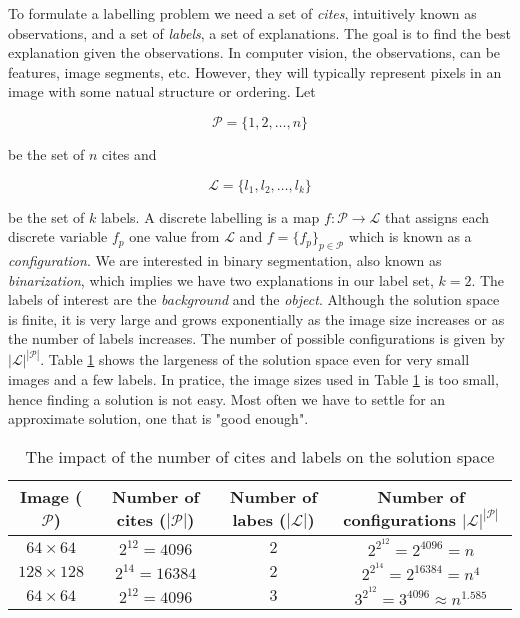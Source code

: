 To formulate a labelling problem we need a set of \textit{cites}, intuitively known as observations, and a set of \textit{labels}, a set of explanations.
The goal is to find the best explanation given the observations.
In computer vision, the observations, can be features, image segments, etc.
However, they will typically represent pixels in an image with some natual structure or ordering.
Let 

\begin{equation*}
	\mathcal{P} = \{1, 2, \ldots, n\}
\end{equation*}

be the set of $n$ cites and 

\begin{equation*}
\mathcal{L} = \{l_1, l_2, \ldots, l_k\}
\end{equation*}

be the set of $k$ labels.
A discrete labelling is a map $f: \mathcal{P} \rightarrow \mathcal{L}$ that assigns each discrete variable $f_p$ one value from $\mathcal{L}$ and $f=\{f_p\}_{p \in \mathcal{P}}$ which is known as a \textit{configuration}.
We are interested in binary segmentation, also known as \textit{binarization}, which implies we have two explanations in our label set, $k=2$.
The labels of interest are the \textit{background} and the \textit{object}.
Although the solution space is finite, it is very large and grows exponentially as the image size increases or as the number of labels increases.
The number of possible configurations is given by $|\mathcal{L}|^{|\mathcal{P}|}$.
Table \ref{tab:configuration} shows the largeness of the solution space even for very small images and a few labels.
In pratice, the image sizes used in Table \ref{tab:configuration} is too small, hence finding a solution is not easy.
Most often we have to settle for an approximate solution, one that is "good enough".

\def\arraystretch{1.2}
\begin{table}[ht]
	\caption{The impact of the number of cites and labels on the solution space}
	\label{tab:configuration}
	\begin{tabular}{|c|c|c|c|}
		\hline 
		Image ($\mathcal{P}$) & Number of cites ($|\mathcal{P}|$) & Number of labes ($|\mathcal{L}|$) & Number of configurations $|\mathcal{L}|^{|\mathcal{P}|}$ \\ 
		\hline 
		$64 \times 64$ & $2^{12}=4096$ & $2$ & $2^{2^{12}} = 2^{4096}=n$ \\
		\hline 
		$128 \times 128$ & $2^{14}=16384$ & $2$ & $2^{2^{14}} = 2^{16384} = n^4$ \\ 
		\hline 
		$64 \times 64$ & $2^{12}=4096$ & $3$ & $3^{2^{12}} = 3^{4096} \approx n^{1.585}$ \\ 
		\hline 
	\end{tabular}
\end{table}
 

